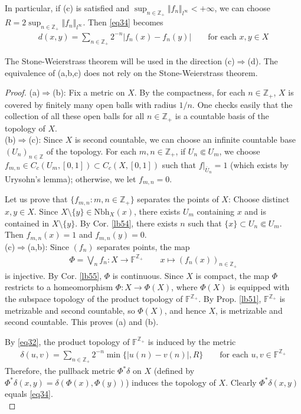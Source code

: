 \documentclass[12pt,b5paper,notitlepage]{article}
\theoremstyle{definition}
\theoremstyle{plain}
\newcommand{\ovl}{\overline}
\newcommand{\Zbb}{\mathbb Z}
\newcommand{\Fbb}{\mathbb F}
\newcommand{\Nbh}{\mathrm{Nbh}}
\numberwithin{equation}{section}
\begin{document}
In particular, if (c) is satisfied and $\sup_{n\in\Zbb_+}\Vert f_n\Vert_{l^\infty}<+\infty$, we can choose $R=2\sup_{n\in\Zbb_+}\Vert f_n\Vert_{l^\infty}$. Then \eqref{eq34} becomes
\begin{gather}\label{eq35}
d(x,y)=\sum_{n\in\Zbb_+}2^{-n}|f_n(x)-f_n(y)|\qquad\text{for each }x,y\in X
\end{gather}



The Stone-Weierstrass theorem will be used in the direction (c)$\Rightarrow$(d). The equivalence of (a,b,c) does not rely on the Stone-Weierstrass theorem.

\begin{proof}
(a)$\Rightarrow$(b): Fix a metric on $X$. By the compactness, for each $n\in\Zbb_+$, $X$ is covered by finitely many open balls with radius $1/n$. One checks easily that the collection of all these open balls for all $n\in\Zbb_+$ is a countable basis of the topology of $X$.\\[-1ex]

(b)$\Rightarrow$(c): Since $X$ is second countable, we can choose an infinite countable base $(U_n)_{n\in\Zbb}$ of the topology. For each $m,n\in\Zbb_+$, if $U_n\Subset U_m$, we choose $f_{m,n}\in C_c(U_m,[0,1])\subset C_c(X,[0,1])$ such that $f|_{\ovl U_n}=1$ (which exists by Urysohn's lemma); otherwise, we let $f_{m,n}=0$. 

Let us prove that $\{f_{m,n}:m,n\in\Zbb_+\}$ separates the points of $X$: Choose distinct $x,y\in X$. Since $X\setminus\{y\}\in\Nbh_X(x)$, there exists $U_m$ containing $x$ and is contained in $X\setminus\{y\}$. By Cor. \ref{lb54}, there exists $n$ such that $\{x\}\subset U_n\Subset U_m$. Then $f_{m,n}(x)=1$ and $f_{m,n}(y)=0$.\\[-1ex]

(c)$\Rightarrow$(a,b): Since $(f_n)$ separates points, the map
\begin{gather*}
\Phi=\bigvee_n f_n:X\rightarrow\Fbb^{\Zbb_+}\qquad x\mapsto (f_n(x))_{n\in\Zbb_+}
\end{gather*}
is injective. By Cor. \ref{lb55}, $\Phi$ is continuous. Since $X$ is compact, the map $\Phi$ restricts to a homeomorphism $\Phi:X\rightarrow\Phi(X)$, where $\Phi(X)$ is equipped with the subspace topology of the product topology of $\Fbb^{\Zbb_+}$. By Prop. \ref{lb51}, $\Fbb^{\Zbb_+}$ is metrizable and second countable, so $\Phi(X)$, and hence $X$, is metrizable and second countable. This proves (a) and (b).

By \eqref{eq32}, the product topology of $\Fbb^{\Zbb_+}$ is induced by the metric
\begin{align*}
\delta(u,v)=\sum_{n\in\Zbb_+}2^{-n}\min\{|u(n)-v(n)|,R\}\qquad\text{for each }u,v\in\Fbb^{\Zbb_+}
\end{align*}
Therefore, the pullback metric $\Phi^*\delta$ on $X$ (defined by $\Phi^*\delta(x,y)=\delta(\Phi(x),\Phi(y))$) induces the topology of $X$. Clearly $\Phi^*\delta(x,y)$ equals \eqref{eq34}. \\[-1ex]


\end{proof}
\end{document}
